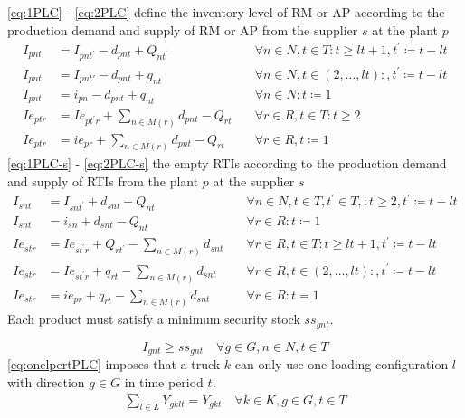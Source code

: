 \eqref{eq:1PLC} - \eqref{eq:2PLC}  define the inventory level of RM or AP according to the production demand and supply of RM or AP  from the supplier $s$ at the plant  $p$
\begin{align}
  I_{pnt}  & =I_{pnt^{\prime}}-d_{pnt}+Q_{nt^{\prime}}\quad             & \forall n \in N,t \in T : t\ge    lt +1,t^{\prime}\coloneqq t-lt \label{eq:1PLC} \\
  I_{pnt}  & =I_{pnt'}-d_{pnt}+q_{nt}\quad                              & \forall n \in N,t \in (2,\dots, lt) : ,t^{\prime}\coloneqq t-lt\label{eq:3PLC}   \\
  I_{pnt}  & =i_{pn}-d_{pnt}+q_{nt}\quad                                & \forall n \in N: t \coloneqq 1 \label{eq:2PLC}                                   \\
  Ie_{ptr} & =Ie_{pt^{\prime}r}+\sum_{n \in M(r)}{d_{pnt}}-Q_{rt} \quad & \forall r \in R,t \in T : t\ge 2                                                 \\
  Ie_{ptr} & =ie_{pr}+\sum_{n \in M(r)}{d_{pnt}}-Q_{rt}\quad            & \forall r \in R , t\coloneqq 1
\end{align}
\eqref{eq:1PLC-s} - \eqref{eq:2PLC-s}  the empty RTIs according to the production demand and supply of RTIs from the plant $p$ at the supplier $s$
\begin{align}
  I_{snt}  & =I_{snt^{\prime}}+d_{snt}-Q_{nt}\quad                              & \forall n \in N,t \in T,t^{\prime} \in T, : t\ge    2,t^{\prime}\coloneqq t-lt \label{eq:1PLC-s} \\
  I_{snt}  & =i_{sn}+d_{snt}-Q_{nt}\quad                                        & \forall r \in R : t\coloneqq 1 \label{eq:2PLC-s}                                                 \\
  Ie_{str} & =Ie_{st^{\prime}r}+Q_{rt^{\prime}}-\sum_{n \in M(r)}{d_{snt}}\quad & \forall r \in R,t \in T : t\ge    lt +1,t^{\prime}\coloneqq t-lt                                 \\
  Ie_{str} & =Ie_{st^{\prime}r}+q_{rt}-\sum_{n \in M(r)}{d_{snt}}\quad          & \forall r \in R,t \in (2,\dots, lt) : ,t^{\prime}\coloneqq t-lt
  \\
  Ie_{str} & =ie_{pr}+q_{rt}-\sum_{n \in M(r)}{d_{snt}}\quad                    & \forall r \in R:t=1
\end{align}
Each product must satisfy a minimum security stock $ss_{gnt}$.

\begin{equation}
  I_{gnt}\ge ss_{gnt}\quad \forall g \in G,n \in N,t \in T
\end{equation}
\eqref{eq:onelpertPLC} imposes that a truck $k$ can only use one loading configuration $l$ with direction $g\in G $ in time period $t$.
\begin{align}
  \sum_{l\in L}Y_{gklt}=Y_{gkt}\quad \forall k \in K,g \in G,t \in T \label{eq:onelpertPLC}
\end{align}

